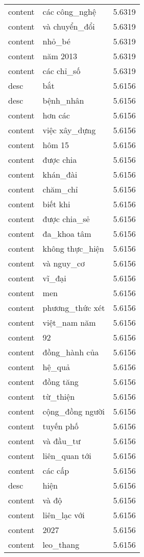 \documentclass{article}
\begin{document}
\begin{tabular}{lll}
content & các công\_nghệ & 5.6319\\
content & và chuyển\_đổi & 5.6319\\
content & nhỏ\_bé & 5.6319\\
content & năm 2013 & 5.6319\\
content & các chỉ\_số & 5.6319\\
desc & bắt & 5.6156\\
desc & bệnh\_nhân & 5.6156\\
content & hơn các & 5.6156\\
content & việc xây\_dựng & 5.6156\\
content & hôm 15 & 5.6156\\
content & được chia & 5.6156\\
content & khán\_đài & 5.6156\\
content & chăm\_chỉ & 5.6156\\
content & biết khi & 5.6156\\
content & được chia\_sẻ & 5.6156\\
content & đa\_khoa tâm & 5.6156\\
content & không thực\_hiện & 5.6156\\
content & và nguy\_cơ & 5.6156\\
content & vĩ\_đại & 5.6156\\
content & men & 5.6156\\
content & phương\_thức xét & 5.6156\\
content & việt\_nam năm & 5.6156\\
content & 92 & 5.6156\\
content & đồng\_hành của & 5.6156\\
content & hệ\_quả & 5.6156\\
content & đồng tăng & 5.6156\\
content & từ\_thiện & 5.6156\\
content & cộng\_đồng người & 5.6156\\
content & tuyến phố & 5.6156\\
content & và đầu\_tư & 5.6156\\
content & liên\_quan tới & 5.6156\\
content & các cấp & 5.6156\\
desc & hiện & 5.6156\\
content & và độ & 5.6156\\
content & liên\_lạc với & 5.6156\\
content & 2027 & 5.6156\\
content & leo\_thang & 5.6156\\

\end{tabular}
\end{document}
